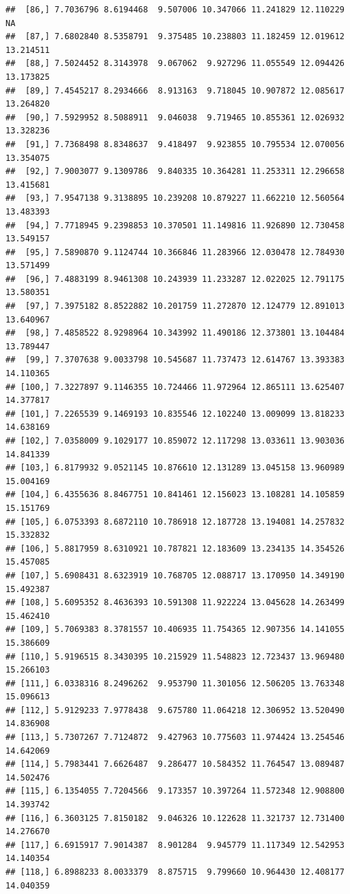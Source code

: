 \documentclass{article}\usepackage[]{graphicx}\usepackage[]{color}
\makeatletter
\newenvironment{kframe}{%
 \def\at@end@of@kframe{}%
 \ifinner\ifhmode%
  \def\at@end@of@kframe{\end{minipage}}%
  \begin{minipage}{\columnwidth}%
 \fi\fi%
 \def\FrameCommand##1{\hskip\@totalleftmargin \hskip-\fboxsep
 \colorbox{shadecolor}{##1}\hskip-\fboxsep
     \hskip-\linewidth \hskip-\@totalleftmargin \hskip\columnwidth}%
 \MakeFramed {\advance\hsize-\width
   \@totalleftmargin\z@ \linewidth\hsize
   \@setminipage}}%
 {\par\unskip\endMakeFramed%
 \at@end@of@kframe}
\newenvironment{knitrout}{}{} %
\makeatother
\begin{document}
\begin{knitrout}
\begin{kframe}
\begin{verbatim}
##  [86,] 7.7036796 8.6194468  9.507006 10.347066 11.241829 12.110229        NA
##  [87,] 7.6802840 8.5358791  9.375485 10.238803 11.182459 12.019612 13.214511
##  [88,] 7.5024452 8.3143978  9.067062  9.927296 11.055549 12.094426 13.173825
##  [89,] 7.4545217 8.2934666  8.913163  9.718045 10.907872 12.085617 13.264820
##  [90,] 7.5929952 8.5088911  9.046038  9.719465 10.855361 12.026932 13.328236
##  [91,] 7.7368498 8.8348637  9.418497  9.923855 10.795534 12.070056 13.354075
##  [92,] 7.9003077 9.1309786  9.840335 10.364281 11.253311 12.296658 13.415681
##  [93,] 7.9547138 9.3138895 10.239208 10.879227 11.662210 12.560564 13.483393
##  [94,] 7.7718945 9.2398853 10.370501 11.149816 11.926890 12.730458 13.549157
##  [95,] 7.5890870 9.1124744 10.366846 11.283966 12.030478 12.784930 13.571499
##  [96,] 7.4883199 8.9461308 10.243939 11.233287 12.022025 12.791175 13.580351
##  [97,] 7.3975182 8.8522882 10.201759 11.272870 12.124779 12.891013 13.640967
##  [98,] 7.4858522 8.9298964 10.343992 11.490186 12.373801 13.104484 13.789447
##  [99,] 7.3707638 9.0033798 10.545687 11.737473 12.614767 13.393383 14.110365
## [100,] 7.3227897 9.1146355 10.724466 11.972964 12.865111 13.625407 14.377817
## [101,] 7.2265539 9.1469193 10.835546 12.102240 13.009099 13.818233 14.638169
## [102,] 7.0358009 9.1029177 10.859072 12.117298 13.033611 13.903036 14.841339
## [103,] 6.8179932 9.0521145 10.876610 12.131289 13.045158 13.960989 15.004169
## [104,] 6.4355636 8.8467751 10.841461 12.156023 13.108281 14.105859 15.151769
## [105,] 6.0753393 8.6872110 10.786918 12.187728 13.194081 14.257832 15.332832
## [106,] 5.8817959 8.6310921 10.787821 12.183609 13.234135 14.354526 15.457085
## [107,] 5.6908431 8.6323919 10.768705 12.088717 13.170950 14.349190 15.492387
## [108,] 5.6095352 8.4636393 10.591308 11.922224 13.045628 14.263499 15.462410
## [109,] 5.7069383 8.3781557 10.406935 11.754365 12.907356 14.141055 15.386609
## [110,] 5.9196515 8.3430395 10.215929 11.548823 12.723437 13.969480 15.266103
## [111,] 6.0338316 8.2496262  9.953790 11.301056 12.506205 13.763348 15.096613
## [112,] 5.9129233 7.9778438  9.675780 11.064218 12.306952 13.520490 14.836908
## [113,] 5.7307267 7.7124872  9.427963 10.775603 11.974424 13.254546 14.642069
## [114,] 5.7983441 7.6626487  9.286477 10.584352 11.764547 13.089487 14.502476
## [115,] 6.1354055 7.7204566  9.173357 10.397264 11.572348 12.908800 14.393742
## [116,] 6.3603125 7.8150182  9.046326 10.122628 11.321737 12.731400 14.276670
## [117,] 6.6915917 7.9014387  8.901284  9.945779 11.117349 12.542953 14.140354
## [118,] 6.8988233 8.0033379  8.875715  9.799660 10.964430 12.408177 14.040359

\end{verbatim}
\end{kframe}
\end{knitrout}
\end{document}
